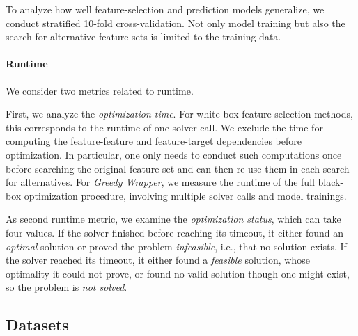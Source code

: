 \documentclass{article}
\theoremstyle{definition}
\begin{document}
To analyze how well feature-selection and prediction models generalize, we conduct stratified 10-fold cross-validation.
Not only model training but also the search for alternative feature sets is limited to the training data.

\paragraph{Runtime}

We consider two metrics related to runtime.

First, we analyze the \emph{optimization time}.
For white-box feature-selection methods, this corresponds to the runtime of one solver call.
We exclude the time for computing the feature-feature and feature-target dependencies before optimization.
In particular, one only needs to conduct such computations once before searching the original feature set and can then re-use them in each search for alternatives.
For \emph{Greedy Wrapper}, we measure the runtime of the full black-box optimization procedure, involving multiple solver calls and model trainings.

As second runtime metric, we examine the \emph{optimization status}, which can take four values.
If the solver finished before reaching its timeout, it either found an \emph{optimal} solution or proved the problem \emph{infeasible}, i.e., that no solution exists.
If the solver reached its timeout, it either found a \emph{feasible} solution, whose optimality it could not prove, or found no valid solution though one might exist, so the problem is \emph{not solved}.

\subsection{Datasets}
\label{sec:afs:experimental-design:datasets}
\end{document}
